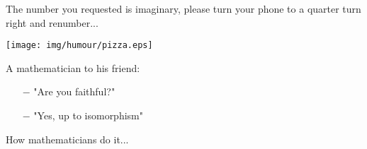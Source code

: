 	The number you requested is imaginary, please turn your phone to a quarter turn right and renumber...
	\begin{center}\underline{\hspace{5 cm}}\end{center}
	
	\begin{center}
		\texttt{[image: img/humour/pizza.eps]}	
	\end{center}
	\begin{center}\underline{\hspace{5 cm}}\end{center}
	
	A mathematician to his friend:

\begin{itemize}	 
	\item[$-$] "Are you faithful?"

	\item[$-$] "Yes, up to isomorphism"	
\end{itemize}
	\begin{center}\underline{\hspace{5 cm}}\end{center}
	
How mathematicians do it...

